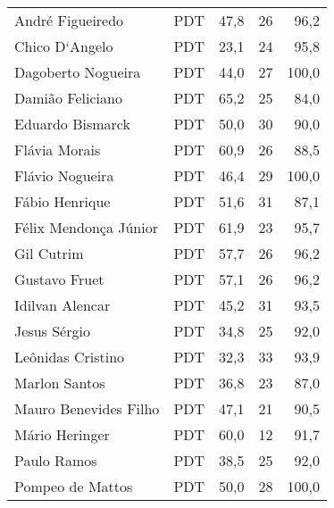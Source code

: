 \begin{longtable}{llrrr}
                    André Figueiredo &            PDT &      47,8 &           26 &       96,2 \\
                      Chico D`Angelo &            PDT &      23,1 &           24 &       95,8 \\
                  Dagoberto Nogueira &            PDT &      44,0 &           27 &      100,0 \\
                    Damião Feliciano &            PDT &      65,2 &           25 &       84,0 \\
                    Eduardo Bismarck &            PDT &      50,0 &           30 &       90,0 \\
                       Flávia Morais &            PDT &      60,9 &           26 &       88,5 \\
                     Flávio Nogueira &            PDT &      46,4 &           29 &      100,0 \\
                      Fábio Henrique &            PDT &      51,6 &           31 &       87,1 \\
               Félix Mendonça Júnior &            PDT &      61,9 &           23 &       95,7 \\
                          Gil Cutrim &            PDT &      57,7 &           26 &       96,2 \\
                       Gustavo Fruet &            PDT &      57,1 &           26 &       96,2 \\
                     Idilvan Alencar &            PDT &      45,2 &           31 &       93,5 \\
                        Jesus Sérgio &            PDT &      34,8 &           25 &       92,0 \\
                   Leônidas Cristino &            PDT &      32,3 &           33 &       93,9 \\
                       Marlon Santos &            PDT &      36,8 &           23 &       87,0 \\
               Mauro Benevides Filho &            PDT &      47,1 &           21 &       90,5 \\
                      Mário Heringer &            PDT &      60,0 &           12 &       91,7 \\
                         Paulo Ramos &            PDT &      38,5 &           25 &       92,0 \\
                    Pompeo de Mattos &            PDT &      50,0 &           28 &      100,0 \\

\end{longtable}
